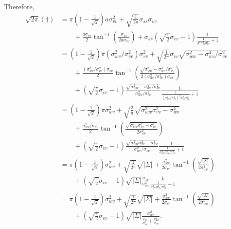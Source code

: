 \documentclass{article}
\begin{document}
Therefore,
\begin{align*}
    \sqrt{2 \pi} (\dagger)
    &= \pi \left( 1 - \frac{1}{\sqrt{2}} \right)a \sigma_{vv}^2+ \sqrt{\frac{1}{2\pi}} \sigma_{ss} \sigma_{vv} \\
    &\qquad + \frac{a \sigma_{vv}}{2} \tan^{-1} \left( \frac{ \sigma_{ss} }{ 2 a \sigma_{vv} } \right) + \sigma_{ss} \left( \sqrt{\frac{\pi}{2}} \sigma_{vv} - 1 \right)\frac{1}{\frac{1}{a^2{\sigma}_{ss}^2{\sigma}_{vv}^2} + 1} \\
    &= \left( 1 - \frac{1}{\sqrt{2}} \right) \pi (\sigma_{wv}^2 / \sigma_{vv}^2) \sigma_{vv}^2 + \sqrt{\frac{1}{2\pi}} \sigma_{vv} \sqrt{\sigma_{ww}^2 - \sigma_{wv}^4 / \sigma_{vv}^2} \\
    &\qquad + \frac{(\sigma_{wv}^2 / \sigma_{vv}^2) \sigma_{vv}}{2} \tan^{-1} \left( \frac{ \sqrt{\sigma_{ww}^2 - \sigma_{wv}^4 / \sigma_{vv}^2} }{ 2 (\sigma_{wv}^2 / \sigma_{vv}^2) \sigma_{vv} } \right) \\
    &\qquad + \left( \sqrt{\frac{\pi}{2}} \sigma_{vv} - 1 \right) \frac{\sqrt{\sigma_{ww}^2 - \sigma_{wv}^4 / \sigma_{vv}^2}}{\sigma_{wv}^2 / \sigma_{vv}^2} \frac{1}{\frac{1}{(\sigma_{wv}^2 / \sigma_{vv}^2)^2 {\sigma}_{ss}^2{\sigma}_{vv}^2} + 1} \\
    &= \left( 1 - \frac{1}{\sqrt{2}} \right) \pi \sigma_{wv}^2 + \sqrt{\frac{2}{\pi}} \sqrt{\sigma_{ww}^2 \sigma_{vv}^2 - \sigma_{wv}^4} \\
    &\qquad + \frac{\sigma_{wv}^2 / \sigma_{vv}}{2} \tan^{-1} \left( \frac{ \sqrt{\sigma_{ww}^2 \sigma_{vv}^2 - \sigma_{wv}^4} }{ 2 \sigma_{wv}^2 } \right) \\
    &\qquad + \left( \sqrt{\frac{\pi}{2}} \sigma_{vv} - 1 \right) \frac{\sqrt{\sigma_{ww}^2 \sigma_{vv}^2 - \sigma_{wv}^4}}{\sigma_{wv}^2 / \sigma_{vv}} \frac{1}{\frac{1}{\sigma_{wv}^4 {\sigma}_{ss}^2 / \sigma_{vv}^2} + 1} \\
    &= \pi \left( 1 - \frac{1}{\sqrt{2}} \right) \sigma_{wv}^2 + \sqrt{\frac{1}{2\pi}} \sqrt{|\Sigma|}
    + \frac{\sigma_{wv}^2}{2 \sigma_{vv}} \tan^{-1} \left( \frac{ \sqrt{|\Sigma|} }{ 2 \sigma_{wv}^2 } \right) \\
    &\qquad + \left( \sqrt{\frac{\pi}{2}} \sigma_{vv} - 1 \right) \sqrt{|\Sigma|} \frac{\sigma_{vv}}{\sigma_{wv}^2} \frac{1}{\frac{1}{\sigma_{wv}^4 {\sigma}_{ss}^2 / \sigma_{vv}^2} + 1} \\
    &= \pi \left( 1 - \frac{1}{\sqrt{2}} \right) \sigma_{wv}^2 + \sqrt{\frac{1}{2\pi}} \sqrt{|\Sigma|}
    + \frac{\sigma_{wv}^2}{2 \sigma_{vv}} \tan^{-1} \left( \frac{ \sqrt{|\Sigma|} }{ 2 \sigma_{wv}^2 } \right) \\
    &\qquad + \left( \sqrt{\frac{\pi}{2}} \sigma_{vv} - 1 \right) \sqrt{|\Sigma|} \frac{\sigma_{wv}^2}{\frac{\sigma_{vv}}{{\sigma}_{ss}^2} + \frac{\sigma_{wv}^4}{\sigma_{vv}}}.
\end{align*}
\end{document}
